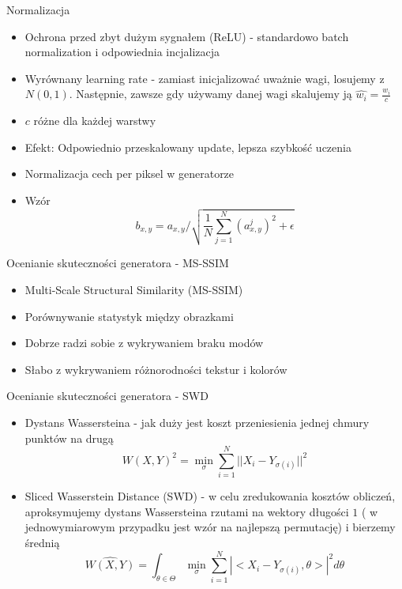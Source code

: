 \documentclass[11pt]{beamer}
\begin{document}
\begin{frame}{Normalizacja}
\begin{itemize}
    \item Ochrona przed zbyt dużym sygnałem (ReLU) - standardowo batch normalization i odpowiednia incjalizacja
    \item Wyrównany learning rate - zamiast inicjalizować uważnie wagi, losujemy z $N(0,1)$. Następnie, zawsze gdy używamy danej wagi skalujemy ją $\hat{w_i} = \frac{w_i}{c}$
    \item $c$ różne dla każdej warstwy
    \item Efekt: Odpowiednio przeskalowany update, lepsza szybkość uczenia
    \item Normalizacja cech per piksel w generatorze
    \item Wzór $$ b_{x,y} = a_{x,y} / \sqrt{\frac{1}{N} \sum_{j=1}^{N} (a_{x,y}^j)^2 + \epsilon}$$
\end{itemize}
\end{frame}

\begin{frame}{Ocenianie skuteczności generatora  - MS-SSIM}
\begin{itemize}
    \item Multi-Scale Structural Similarity (MS-SSIM)
    \item Porównywanie statystyk między obrazkami
    \item Dobrze radzi sobie z wykrywaniem braku modów
    \item Słabo z wykrywaniem różnorodności tekstur i kolorów
\end{itemize}
\end{frame}

\begin{frame}{Ocenianie skuteczności generatora - SWD}
\begin{itemize}
    \item Dystans Wassersteina - jak duży jest koszt przeniesienia jednej chmury punktów na drugą
    $$ W(X,Y)^2 = \min_{\sigma} \sum_{i=1}^N ||X_i - Y_{\sigma(i)} ||^2$$
    \item Sliced Wasserstein Distance (SWD)  - w celu zredukowania kosztów obliczeń, aproksymujemy dystans Wassersteina rzutami na wektory długości $1$ ( w jednowymiarowym przypadku jest wzór na najlepszą permutację) i bierzemy średnią 
    $$ \hat{W(X,Y)} = \int_{\theta \in \Theta} \min_{\sigma} \sum_{i=1}^N  |<X_i-Y_{\sigma(i)}, \theta>|^2 d\theta$$
\end{itemize}
\end{frame}
\end{document}
